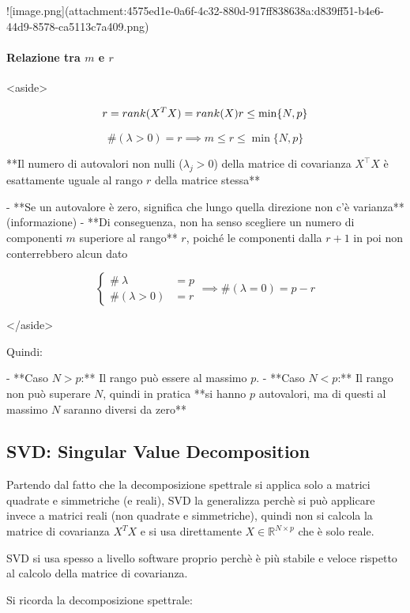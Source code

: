 ![image.png](attachment:4575ed1e-0a6f-4c32-880d-917ff838638a:d839ff51-b4e6-44d9-8578-ca5113c7a409.png)

\paragraph{Relazione tra $m$ e $r$}

<aside>


$$
r=rank(X^TX)=rank(X)\\ r \le \min\{N, p\}
$$

$$
\#(\lambda>0)=r\implies m\le r\le \min\{N, p\}
$$

**Il numero di autovalori non nulli ($\lambda_j > 0$) della matrice di covarianza $X^\top X$ è esattamente uguale al rango $r$ della matrice stessa**

- **Se un autovalore è zero, significa che lungo quella direzione non c'è varianza** (informazione)
- **Di conseguenza, non ha senso scegliere un numero di componenti $m$ superiore al rango** $r$, poiché le componenti dalla $r+1$ in poi non conterrebbero alcun dato

$$
\begin{cases}
	\#\ \lambda&=p\\
	\#(\lambda>0)&=r
\end{cases}\implies
\#(\lambda=0)=p-r
$$

</aside>

Quindi:

- **Caso $N > p$:** Il rango può essere al massimo $p$.
- **Caso $N < p$:** Il rango non può superare $N$, quindi in pratica **si hanno $p$ autovalori, ma di questi al massimo $N$ saranno diversi da zero**

\subsection{SVD: Singular Value Decomposition}

Partendo dal fatto che la decomposizione spettrale si applica solo a matrici quadrate e simmetriche (e reali), SVD la generalizza perchè si può applicare invece a matrici reali (non quadrate e simmetriche), quindi non si calcola la matrice di covarianza $X^TX$ e si usa direttamente $X\in\mathbb{R}^{N\times p}$ che è solo reale.

SVD si usa spesso a livello software proprio perchè è più stabile e veloce rispetto al calcolo della matrice di covarianza.

Si ricorda la decomposizione spettrale:

